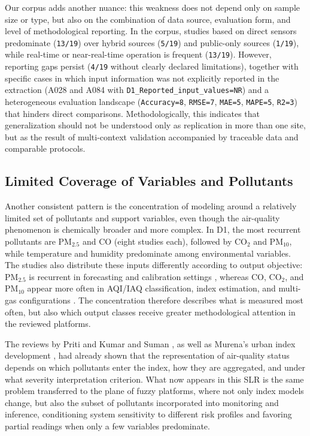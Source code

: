 Our corpus adds another nuance: this weakness does not depend only on sample size or type, but also on the combination of data source, evaluation form, and level of methodological reporting. In the corpus, studies based on direct sensors predominate (\texttt{13/19}) over hybrid sources (\texttt{5/19}) and public-only sources (\texttt{1/19}), while real-time or near-real-time operation is frequent (\texttt{13/19}). However, reporting gaps persist (\texttt{4/19} without clearly declared limitations), together with specific cases in which input information was not explicitly reported in the extraction (A028 and A084 with \texttt{D1\_Reported\_input\_values=NR}) and a heterogeneous evaluation landscape (\texttt{Accuracy=8}, \texttt{RMSE=7}, \texttt{MAE=5}, \texttt{MAPE=5}, \texttt{R2=3}) that hinders direct comparisons. Methodologically, this indicates that generalization should not be understood only as replication in more than one site, but as the result of multi-context validation accompanied by traceable data and comparable protocols.

\subsection{Limited Coverage of Variables and Pollutants}
Another consistent pattern is the concentration of modeling around a relatively limited set of pollutants and support variables, even though the air-quality phenomenon is chemically broader and more complex. In D1, the most recurrent pollutants are PM$_{2.5}$ and CO (eight studies each), followed by CO$_2$ and PM$_{10}$, while temperature and humidity predominate among environmental variables. The studies also distribute these inputs differently according to output objective: PM$_{2.5}$ is recurrent in forecasting and calibration settings \cite{A084,A135,A144,A157}, whereas CO, CO$_2$, and PM$_{10}$ appear more often in AQI/IAQ classification, index estimation, and multi-gas configurations \cite{A009,A028,A136,A149,A167,A168,A178}. The concentration therefore describes what is measured most often, but also which output classes receive greater methodological attention in the reviewed platforms.

The reviews by Priti and Kumar \cite{ART01} and Suman \cite{ART02}, as well as Murena's urban index development \cite{PROB08}, had already shown that the representation of air-quality status depends on which pollutants enter the index, how they are aggregated, and under what severity interpretation criterion. What now appears in this SLR is the same problem transferred to the plane of fuzzy platforms, where not only index models change, but also the subset of pollutants incorporated into monitoring and inference, conditioning system sensitivity to different risk profiles and favoring partial readings when only a few variables predominate.

